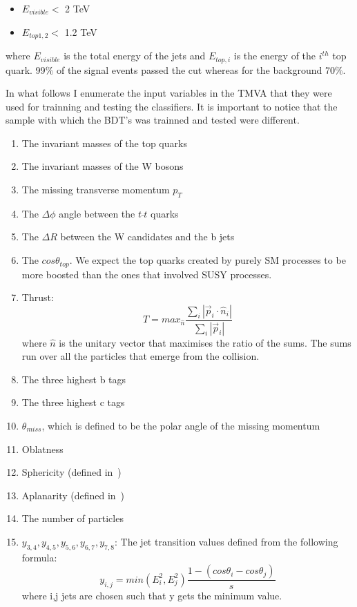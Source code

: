 \documentclass[12pt,a4paper]{report}
\begin{document}
\begin{itemize}
 \item $E_{visible} <$ 2 TeV
 \item $E_{top 1,2} <$ 1.2 TeV
\end{itemize}

where $E_{visible}$ is the total energy of the jets and $E_{top,i}$ is the energy of the $i^{th}$ top quark.
99$\%$ of the signal events passed the cut whereas for the background 70$\%$.

In what follows I enumerate the input variables in the TMVA that they were used for trainning and testing 
the classifiers. It is important to notice that the sample with which the BDT's was trainned and tested were
different.

\begin{enumerate}
 \item The invariant masses of the top quarks
 \item The invariant masses of the W bosons
 \item The missing transverse momentum  $p_{T}$
 \item The $\Delta \phi$ angle between the $t\bar{}t$ quarks
 \item The $\Delta R$  between the W candidates and the b jets
 \item The $cos\theta_{top}$. We expect the top quarks created by purely SM processes to be more boosted 
 than the ones that involved SUSY processes.
 \item Thrust: 
 \begin{equation}
  T=max_{\hat{n}}\frac{\sum_{i}^{}|\vec{p}_{i}\cdot \hat{n}_{i}|}{\sum_{i}^{}|\vec{p}_{i}|}
 \end{equation}
	where $\hat{n}$ is the unitary vector that maximises the ratio of the sums. The sums run over all the
	particles that emerge from the collision.

	
  \item The three highest b tags
  \item The three highest c tags
  \item $\theta_{miss}$, which is defined to be the polar angle of the missing momentum
  \item Oblatness
  \item Sphericity (defined in~\cite{chen2012new})
  \item Aplanarity (defined in~\cite{chen2012new})
  \item The number of particles
  \item $y_{3,4},y_{4,5},y_{5,6},y_{6,7},y_{7,8}$: The jet transition values defined from the following 
  formula:
  \begin{equation}
   y_{i,j}=min(E_{i}^{2},E_{j}^{2})\frac{1-(cos\theta_{i}-cos\theta_{j})}{s}
  \end{equation}
  where i,j jets are chosen such that y gets the minimum value. 
\end{enumerate}  
\end{document}
